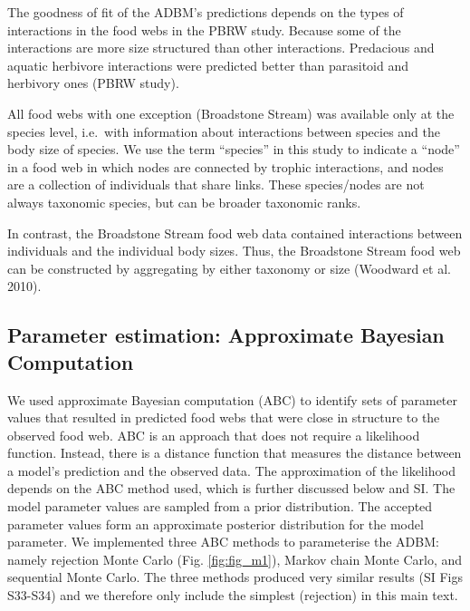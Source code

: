 \documentclass{article}
\begin{document}
The goodness of fit of the ADBM's predictions depends on the types of
interactions in the food webs in the PBRW study. Because some of the
interactions are more size structured than other interactions.
Predacious and aquatic herbivore interactions were predicted better than
parasitoid and herbivory ones (PBRW study).

All food webs with one exception (Broadstone Stream) was available only
at the species level, i.e.~with information about interactions between
species and the body size of species. We use the term ``species'' in
this study to indicate a ``node'' in a food web in which nodes are
connected by trophic interactions, and nodes are a collection of
individuals that share links. These species/nodes are not always
taxonomic species, but can be broader taxonomic ranks.

In contrast, the Broadstone Stream food web data contained interactions
between individuals and the individual body sizes. Thus, the Broadstone
Stream food web can be constructed by aggregating by either taxonomy or
size (Woodward et al. 2010).

\hypertarget{parameter-estimation-approximate-bayesian-computation}{%
\subsection{Parameter estimation: Approximate Bayesian
Computation}\label{parameter-estimation-approximate-bayesian-computation}}

We used approximate Bayesian computation (ABC) to identify sets of
parameter values that resulted in predicted food webs that were close in
structure to the observed food web. ABC is an approach that does not
require a likelihood function. Instead, there is a distance function
that measures the distance between a model's prediction and the observed
data. The approximation of the likelihood depends on the ABC method
used, which is further discussed below and SI. The model parameter
values are sampled from a prior distribution. The accepted parameter
values form an approximate posterior distribution for the model
parameter. We implemented three ABC methods to parameterise the ADBM:
namely rejection Monte Carlo (Fig. \ref{fig:fig_m1}), Markov chain Monte
Carlo, and sequential Monte Carlo. The three methods produced very
similar results (SI Figs S33-S34) and we therefore only include the
simplest (rejection) in this main text.
\end{document}
